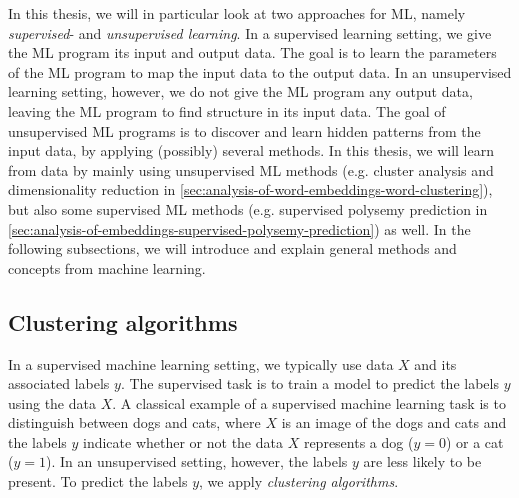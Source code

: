 In this thesis, we will in particular look at two approaches for ML, namely \textit{supervised}- and \textit{unsupervised learning}. In a supervised learning setting, we give the ML program its input and output data. The goal is to learn the parameters of the ML program to map the input data to the output data. In an unsupervised learning setting, however, we do not give the ML program any output data, leaving the ML program to find structure in its input data. The goal of unsupervised ML programs is to discover and learn hidden patterns from the input data, by applying (possibly) several methods. In this thesis, we will learn from data by mainly using unsupervised ML methods (e.g. cluster analysis and dimensionality reduction in \cref{sec:analysis-of-word-embeddings-word-clustering}), but also some supervised ML methods (e.g. supervised polysemy prediction in \cref{sec:analysis-of-embeddings-supervised-polysemy-prediction}) as well. In the following subsections, we will introduce and explain general methods and concepts from machine learning.

\subsection{Clustering algorithms}
\label{sec:clustering-algorithms}
In a supervised machine learning setting, we typically use data $X$ and its associated labels $y$. The supervised task is to train a model to predict the labels $y$ using the data $X$. A classical example of a supervised machine learning task is to distinguish between dogs and cats, where $X$ is an image of the dogs and cats and the labels $y$ indicate whether or not the data $X$ represents a dog ($y=0$) or a cat ($y=1$). In an unsupervised setting, however, the labels $y$ are less likely to be present. To predict the labels $y$, we apply \textit{clustering algorithms}.

